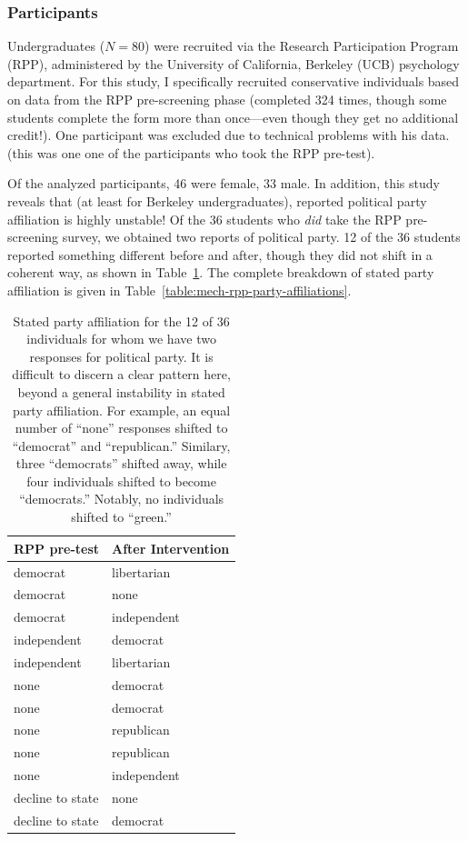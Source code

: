 \subsubsection{Participants}

Undergraduates ($N=80$) were recruited via the Research Participation Program
(RPP), administered by the University of California, Berkeley (UCB) psychology
department. For this study, I specifically recruited conservative individuals
based on data from the RPP pre-screening phase (completed 324 times, though some
students complete the form more than once---even though they get no additional
credit!). One participant was excluded due to technical problems with his data.
(this was one one of the participants who took the RPP pre-test).

Of the analyzed participants, 46 were female, 33 male. In addition, this study
reveals that (at least for Berkeley undergraduates), reported political party
affiliation is highly unstable! Of the 36 students who \emph{did} take the
RPP pre-screening survey, we obtained two reports of political party. 12 of the
36 students reported something different before and after, though they did not
shift in a coherent way, as shown in Table~\ref{table:mech-rpp-party-shifts}.
The complete breakdown of stated party affiliation is given in
Table~\ref{table:mech-rpp-party-affiliations}.

\begin{table}[ht]
\centering
\caption{Stated party affiliation for the 12 of 36 individuals for whom we have
    two responses for political party. It is difficult to discern a clear
    pattern here, beyond a general instability in stated party affiliation. For
    example, an equal number of “none” responses shifted to “democrat” and
    “republican.” Similary, three “democrats” shifted away, while four
    individuals shifted to become “democrats.” Notably, no individuals shifted
    to “green.”}
\label{table:mech-rpp-party-shifts}
\begin{tabular}{ll}
  \toprule
 RPP pre-test & After Intervention \\ 
  \midrule
   democrat & libertarian \\ 
   democrat & none \\ 
   democrat & independent \\ 
   independent & democrat \\ 
   independent & libertarian \\ 
   none & democrat \\ 
   none & democrat \\ 
   none & republican \\ 
   none & republican \\ 
   none & independent \\ 
   decline to state & none \\ 
   decline to state & democrat \\ 
   \bottomrule
\end{tabular}
\end{table}

